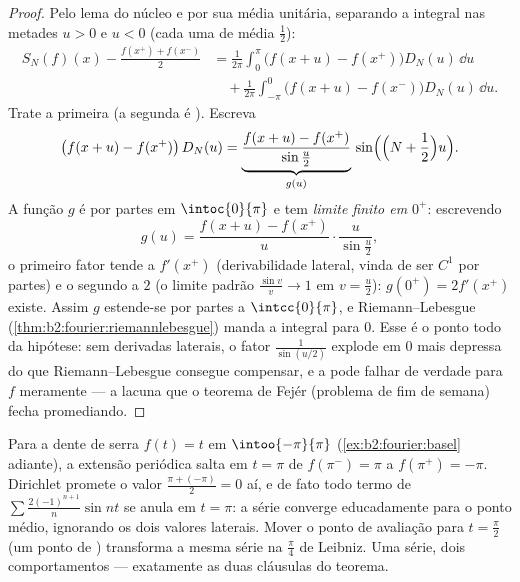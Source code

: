 \begin{proof}
Pelo lema do núcleo e por sua média unitária, separando a integral nas
metades $u > 0$ e $u < 0$ (cada uma de média $\frac12$):
\begin{align*}
S_N(f)(x) - \frac{f(x^+) + f(x^-)}{2}
&= \frac{1}{2\pi}\int_{0}^{\pi} \bigl(f(x+u) -
f(x^+)\bigr)D_N(u)\,\dd u\\
&\quad+ \frac{1}{2\pi}\int_{-\pi}^{0}\bigl(f(x+u) -
f(x^-)\bigr)D_N(u)\,\dd u .
\end{align*}
Trate a primeira (a segunda é ). Escreva
\[
\bigl(f(x + u) - f(x^+)\bigr)\,D_N(u)
= \underbrace{\frac{f(x+u) - f(x^+)}{\sin\frac u2}}_{g(u)}\,
\sin\Bigl(\Bigl(N + \frac12\Bigr)u\Bigr) .
\]
A função $g$ é  por partes em $\intoc{0}{\pi}$ e
tem \emph{limite finito em $0^+$}: escrevendo
\[
g(u) = \frac{f(x+u) - f(x^+)}{u}\cdot\frac{u}{\sin\frac u2} ,
\]
o primeiro fator tende a $f'(x^+)$ (derivabilidade
lateral, vinda de ser $C^1$ por partes) e o segundo a $2$
(o limite padrão $\frac{\sin v}{v} \to 1$ em $v = \frac
u2$): $g(0^+) = 2f'(x^+)$ existe. Assim $g$ estende-se
 por partes a $\intcc{0}{\pi}$, e Riemann--Lebesgue
(\cref{thm:b2:fourier:riemannlebesgue}) manda a integral para
$0$. Esse é o ponto todo da hipótese: sem
derivadas laterais, o fator $\frac{1}{\sin(u/2)}$ explode
em $0$ mais depressa do que Riemann--Lebesgue consegue compensar, e a
 pode falhar de verdade para $f$ meramente
 --- a lacuna que o teorema de Fejér (problema de fim de semana)
fecha promediando.
\end{proof}

\begin{example}\label{ex:b2:fourier:jumpvalue}
Para a dente de serra $f(t) = t$ em $\intoo{-\pi}{\pi}$
(\cref{ex:b2:fourier:basel} adiante), a extensão periódica
salta em $t = \pi$ de $f(\pi^-) = \pi$ a $f(\pi^+) = -\pi$.
Dirichlet promete o valor $\frac{\pi + (-\pi)}{2} = 0$
aí, e de fato todo termo de $\sum
\frac{2(-1)^{n+1}}{n}\sin nt$ se anula em $t = \pi$: a
série converge educadamente para o ponto médio, ignorando os dois
valores laterais. Mover o ponto de avaliação para $t =
\frac\pi2$ (um ponto de ) transforma a mesma série
na $\frac\pi4$ de Leibniz. Uma série, dois comportamentos ---
exatamente as duas cláusulas do teorema.
\end{example}

